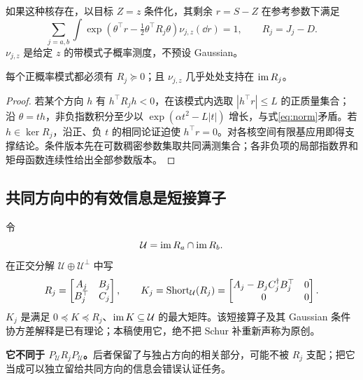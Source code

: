 \documentclass[UTF8,fontset=fandol,11pt,a4paper]{ctexart}
\theoremstyle{definition}\newtheorem{definition}[theorem]{定义}\newtheorem{assumption}[theorem]{条件}
\numberwithin{equation}{section}
\begin{document}
如果这种核存在，以目标 $Z=z$ 条件化，其剩余 $r=S-Z$ 在参考参数下满足
\begin{equation}
\sum_{j=a,b}\int
\exp\!\left(\theta^\top r-\tfrac12\theta^\top R_j\theta\right)
\nu_{j,z}(\dd r)=1,
\qquad R_j=J_j-D.
\label{eq:norm}
\end{equation}
$\nu_{j,z}$ 是给定 $z$ 的带模式子概率测度，不预设 Gaussian。

\begin{lemma}[必要的信息顺序与剩余支撑]
\label{lem:support}
每个正概率模式都必须有 $R_j\succeq0$；且 $\nu_{j,z}$ 几乎处处支持在 $\operatorname{im} R_j$。
\end{lemma}
\begin{proof}
若某个方向 $h$ 有 $h^\top R_jh<0$，在该模式内选取 $|h^\top r|\le L$ 的正质量集合；沿 $\theta=th$，非负指数积分至少以 $\exp(\alpha t^2-L|t|)$ 增长，与式\eqref{eq:norm}矛盾。若 $h\in\ker R_j$，沿正、负 $t$ 的相同论证迫使 $h^\top r=0$。对各核空间有限基应用即得支撑结论。条件版本先在可数稠密参数集取共同满测集合；各非负项的局部指数界和矩母函数连续性给出全部参数版本。
\end{proof}

\subsection{共同方向中的有效信息是短接算子}
令
\begin{equation}
\mathcal U=\operatorname{im} R_a\cap\operatorname{im} R_b.
\end{equation}
在正交分解 $\mathcal U\oplus\mathcal U^\perp$ 中写
\begin{equation}
R_j=\begin{bmatrix}A_j&B_j\\B_j^\top&C_j\end{bmatrix},\qquad
K_j=\operatorname{Short}_{\mathcal U}(R_j)
=\begin{bmatrix}A_j-B_jC_j^\dagger B_j^\top&0\\0&0\end{bmatrix}.
\label{eq:short}
\end{equation}
$K_j$ 是满足 $0\preceq K\preceq R_j$、$\operatorname{im} K\subseteq\mathcal U$ 的最大矩阵。该短接算子及其 Gaussian 条件协方差解释是已有理论\cite{anderson,owhadi}；本稿使用它，绝不把 Schur 补重新声称为原创。

\textbf{它不同于 $P_{\mathcal U}R_jP_{\mathcal U}$。}后者保留了与独占方向的相关部分，可能不被 $R_j$ 支配；把它当成可以独立留给共同方向的信息会错误认证任务。
\end{document}
